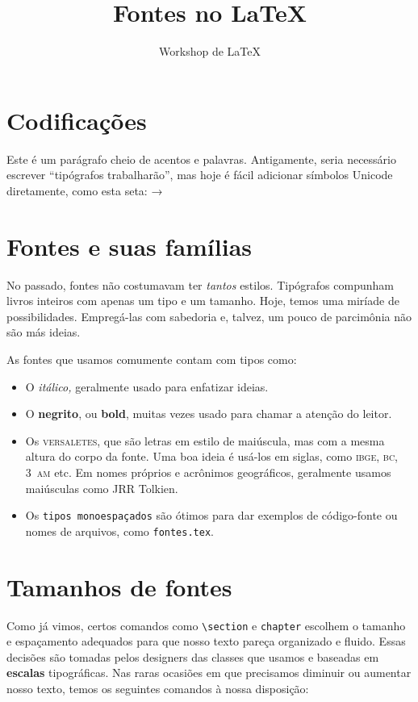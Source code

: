 \documentclass[11pt,a4paper,oneside]{article}
\title{Fontes no \LaTeX}
\author{Workshop de LaTeX}
\begin{document}
\frenchspacing

\maketitle

\section{Codificações}

Este é um parágrafo cheio de acentos e palavras. Antigamente, seria necessário
escrever “tip\'{o}grafos trabalhar\~{a}o”, mas hoje é fácil adicionar símbolos
Unicode diretamente, como esta seta: →

\section{Fontes e suas famílias}

No passado, fontes não costumavam ter \emph{tantos} estilos. Tipógrafos
compunham livros inteiros com apenas um tipo e um tamanho. Hoje, temos uma
miríade de possibilidades. Empregá-las com sabedoria e, talvez, um pouco de
parcimônia não são más ideias.

As fontes que usamos comumente contam com tipos como:

\begin{itemize}
  \item O \emph{itálico,} geralmente usado para enfatizar ideias.
  \item O \textbf{negrito}, ou \textbf{bold}, muitas vezes usado para chamar a
    atenção do leitor.
  \item Os \textsc{versaletes}, que são letras em estilo de maiúscula, mas com
    a mesma altura do corpo da fonte. Uma boa ideia é usá-los em siglas, como
    \textsc{ibge}, \textsc{bc}, 3~\textsc{am} etc. Em nomes próprios e
    acrônimos geográficos, geralmente usamos maiúsculas como JRR Tolkien.
  \item Os \texttt{tipos monoespaçados} são ótimos para dar exemplos de
    código-fonte ou nomes de arquivos, como \texttt{fontes.tex}.
\end{itemize}

\section{Tamanhos de fontes}

Como já vimos, certos comandos como \verb+\section+ e \verb+chapter+ escolhem o
tamanho e espaçamento adequados para que nosso texto pareça organizado e
fluido. Essas decisões são tomadas pelos designers das classes que usamos e
baseadas em \textbf{escalas} tipográficas. Nas raras ocasiões em que precisamos
\footnotesize diminuir \Large ou aumentar \normalsize nosso texto, temos os seguintes
comandos à nossa disposição:
\end{document}
